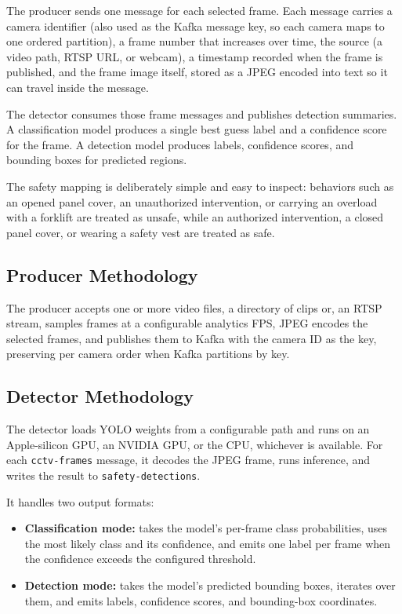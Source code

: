 \documentclass[conference]{IEEEtran}
\begin{document}
The producer sends one message for each selected frame. Each message carries a
camera identifier (also used as the Kafka message key, so each camera maps to one
ordered partition), a frame number that increases over time, the source (a video
path, RTSP URL, or webcam), a timestamp recorded when the frame is published, and
the frame image itself, stored as a JPEG encoded into text so it can travel
inside the message.

The detector consumes those frame messages and publishes detection summaries.
A classification model produces a single best guess label and a confidence score
for the frame. A detection model produces labels, confidence scores, and bounding
boxes for predicted regions.

The safety mapping is deliberately simple and easy to inspect: behaviors such as
an opened panel cover, an unauthorized intervention, or carrying an overload with
a forklift are treated as unsafe, while an authorized intervention, a closed
panel cover, or wearing a safety vest are treated as safe.

\subsection{Producer Methodology}
The producer accepts one or more video files, a directory of clips or, an RTSP stream, samples frames at a configurable analytics FPS, JPEG encodes the selected frames, and publishes them to Kafka with the camera ID as the key, preserving per camera order when Kafka partitions by key.

\subsection{Detector Methodology}

The detector loads YOLO weights from a configurable path and runs on an
Apple-silicon GPU, an NVIDIA GPU, or the CPU, whichever is available. For each
\texttt{cctv-frames} message, it decodes the JPEG frame, runs inference, and
writes the result to \texttt{safety-detections}.

It handles two output formats:

\begin{itemize}
    \item \textbf{Classification mode:} takes the model's per-frame class
    probabilities, uses the most likely class and its confidence, and emits one
    label per frame when the confidence exceeds the configured threshold.

    \item \textbf{Detection mode:} takes the model's predicted bounding boxes,
    iterates over them, and emits labels, confidence scores, and bounding-box
    coordinates.
\end{itemize}
\end{document}
